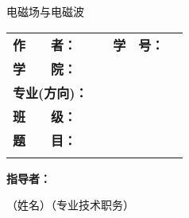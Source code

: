 \documentclass[twoside, openright]{report}
\numberwithin{Exercise}{chapter}
\numberwithin{Answer}{chapter}
\begin{document}

\newcommand{\Title}{电磁场与电磁波}

\begin{titlepage}
	\centering
	\begin{spacing}{1}
		\vspace{0.5\ccwd}

		\vspace{1\ccwd}

    \njustwhole[njust][0.5]

		\vspace{0.2\ccwd}

		\fontsize{45pt}{45pt}\selectfont\heiti
		\Title

		\vspace{2\ccwd}
	\end{spacing}

	\begin{spacing}{1.5}
		\begin{tabu} to 12.59cm{@{}X[c, 3.2cm]@{}X[c, 4cm]@{}X[c, 2.22cm]@{}X[c, 3.89cm]@{}}
			\textbf{作　　者：} & \underline{} & \textbf{学　号：} & \underline{} \\
			\textbf{学　　院：} &  \\
			\textbf{专业(方向)：} &  \\
			\textbf{班　　级：} &  \\
			\textbf{题　　目：} &  \\
			\textbf{} & 
		\end{tabu}
		\vspace{0em}
	\end{spacing}

	\begin{spacing}{1}
		\vspace{3\ccwd}

		\textbf{指导者：}\underline{\makebox[15.5\ccwd][c]{}}

		\hspace{5em}（姓名）\hspace{11em}（专业技术职务）


\end{spacing}
\end{titlepage}
\end{document}
